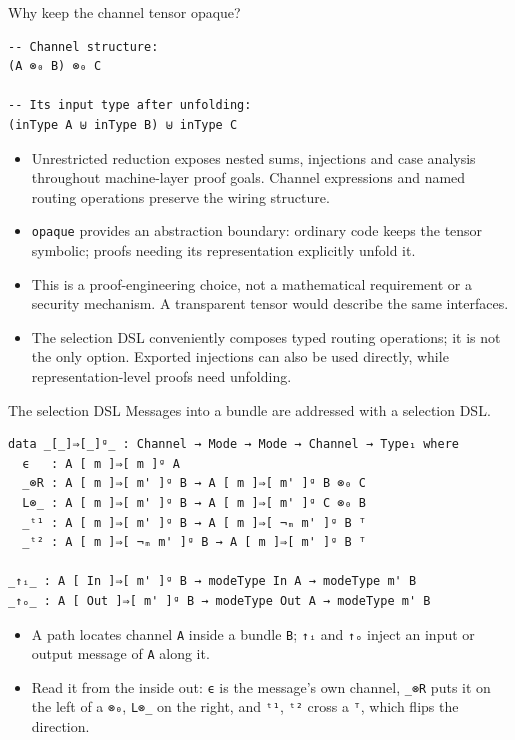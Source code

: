 \documentclass[aspectratio=169,10pt]{beamer}
\newcommand{\agda}[1]{\texttt{#1}}
\begin{document}
\begin{frame}[fragile]{Why keep the channel tensor opaque?}
\begin{verbatim}
-- Channel structure:
(A ⊗₀ B) ⊗₀ C

-- Its input type after unfolding:
(inType A ⊎ inType B) ⊎ inType C
\end{verbatim}
  \begin{itemize}
    \item Unrestricted reduction exposes nested sums, injections and case
          analysis throughout machine-layer proof goals.  Channel expressions
          and named routing operations preserve the wiring structure.
    \item \agda{opaque} provides an abstraction boundary: ordinary code
          keeps the tensor symbolic; proofs needing its representation
          explicitly unfold it.
    \item This is a proof-engineering choice, not a mathematical requirement
          or a security mechanism.  A transparent tensor would describe the
          same interfaces.
    \item The selection DSL conveniently composes typed routing operations;
          it is not the only option.  Exported injections can also be used
          directly, while representation-level proofs need unfolding.
  \end{itemize}
\end{frame}

\begin{frame}[fragile]{The selection DSL}
Messages into a bundle are addressed with a selection DSL.
\begin{verbatim}
data _[_]⇒[_]ᵍ_ : Channel → Mode → Mode → Channel → Type₁ where
  ϵ   : A [ m ]⇒[ m ]ᵍ A
  _⊗R : A [ m ]⇒[ m' ]ᵍ B → A [ m ]⇒[ m' ]ᵍ B ⊗₀ C
  L⊗_ : A [ m ]⇒[ m' ]ᵍ B → A [ m ]⇒[ m' ]ᵍ C ⊗₀ B
  _ᵗ¹ : A [ m ]⇒[ m' ]ᵍ B → A [ m ]⇒[ ¬ₘ m' ]ᵍ B ᵀ
  _ᵗ² : A [ m ]⇒[ ¬ₘ m' ]ᵍ B → A [ m ]⇒[ m' ]ᵍ B ᵀ

_↑ᵢ_ : A [ In ]⇒[ m' ]ᵍ B → modeType In A → modeType m' B
_↑ₒ_ : A [ Out ]⇒[ m' ]ᵍ B → modeType Out A → modeType m' B
\end{verbatim}
  \begin{itemize}
    \item A path locates channel \agda{A} inside a bundle \agda{B};
          \agda{↑ᵢ} and \agda{↑ₒ} inject an input or output message of
          \agda{A} along it.
    \item Read it from the inside out: \agda{ϵ} is the message's own
          channel, \agda{\_⊗R} puts it on the left of a \agda{⊗₀},
          \agda{L⊗\_} on the right, and \agda{ᵗ¹}, \agda{ᵗ²} cross a
          \agda{ᵀ}, which flips the direction.
  \end{itemize}
\end{frame}
\end{document}

